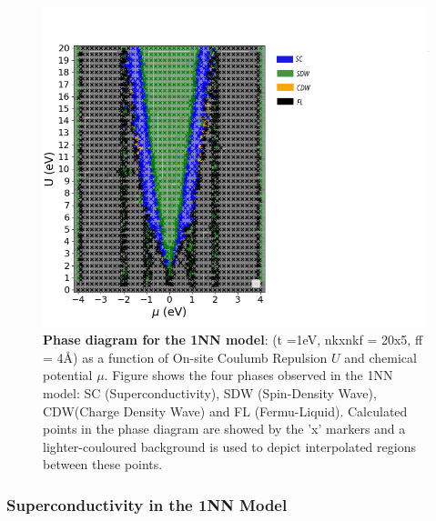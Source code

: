 \documentclass[12pt]{article}
\begin{document}
\begin{figure}[htbp]  %
    \centering
    \includegraphics[width=1.25\textwidth]{1NNphasediagram.png}  %
    \caption{\textbf{Phase diagram for the 1NN model}:  (t =1eV, nkxnkf = 20x5, ff = 4\AA) as a function of On-site Coulumb Repulsion $U$ and chemical potential $\mu$. 
    Figure shows the four phases observed in the 1NN model: SC (Superconductivity), SDW (Spin-Density Wave), CDW(Charge Density Wave) and FL (Fermu-Liquid).
    Calculated points in the phase diagram are showed by the 'x' markers and a lighter-couloured background is used to depict interpolated regions between these points. }
    \label{fig:1NNpd}
\end{figure}


\subsubsection{Superconductivity in the 1NN Model}
\end{document}
